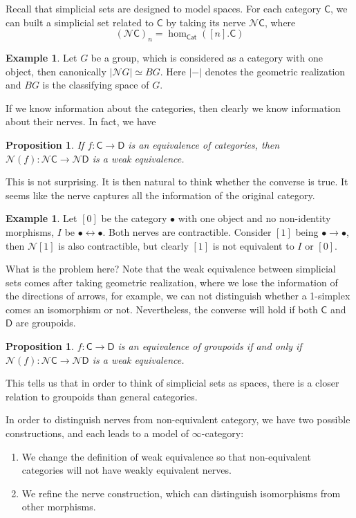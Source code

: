 \documentclass[12pt]{amsart}
\newtheorem{prop}[thm]{Proposition}
\theoremstyle{definition}
\newtheorem{example}[thm]{Example}
\theoremstyle{remark}
\numberwithin{equation}{section}
\newcommand{\CC}{{\mathsf C}}
\newcommand{\CD}{{\mathsf D}}
\newcommand{\CN}{{\mathcal N}}
\newcommand{\1}{{\mathbb{1}}}
\newcommand{\cat}{\mathsf{Cat}}
\begin{document}
Recall that simplicial sets are designed to model spaces. For each category $\CC$, we can built a simplicial set related to $\CC$ by taking its nerve $\CN \CC$, where
\begin{equation*}
(\CN \CC)_n = \hom_{\cat}([n]. \CC)
\end{equation*}
\begin{example}
	Let $G$ be a group, which is considered as a category with one object, then canonically $|\CN G| \simeq BG$. Here $|-|$ denotes the geometric realization and $BG$ is the classifying space of $G$.
\end{example}

If we know information about the categories, then clearly we know information about their nerves. In fact, we have
\begin{prop}
	If $f:\CC \to \CD$ is an equivalence of categories, then $\CN(f): \CN \CC \to \CN \CD$ is a weak equivalence.
\end{prop}
This is not surprising. It is then natural to think whether the converse is true. It seems like the nerve captures all the information of the original category.

\begin{example}
	Let $[0]$ be the category $\bullet$ with one object and no non-identity morphisms, $I$ be $\bullet \leftrightarrow \bullet$. Both nerves are contractible. Consider $[1]$ being $\bullet \to \bullet$, then $\CN [1]$ is also contractible, but clearly $[1]$ is not equivalent to $I$ or $[0]$.
\end{example}

What is the problem here? Note that the weak equivalence between simplicial sets comes after taking geometric realization, where we lose the information of the directions of arrows, for example, we can not distinguish whether a 1-simplex comes an isomorphism or not. Nevertheless, the converse will hold if both $\CC$ and $\CD$ are groupoids.
\begin{prop}
	$f:\CC \to \CD$ is an equivalence of groupoids if and only if $\CN(f): \CN \CC \to \CN \CD$ is a weak equivalence.
\end{prop}

This tells us that in order to think of simplicial sets as spaces, there is a closer relation to groupoids than general categories.

In order to distinguish nerves from non-equivalent category, we have two possible constructions, and each leads to a model of $\infty$-category:
\begin{enumerate}
	\item We change the definition of weak equivalence so that non-equivalent categories will not have weakly equivalent nerves.
	\item We refine the nerve construction, which can distinguish isomorphisms from other morphisms.
\end{enumerate}
\end{document}
